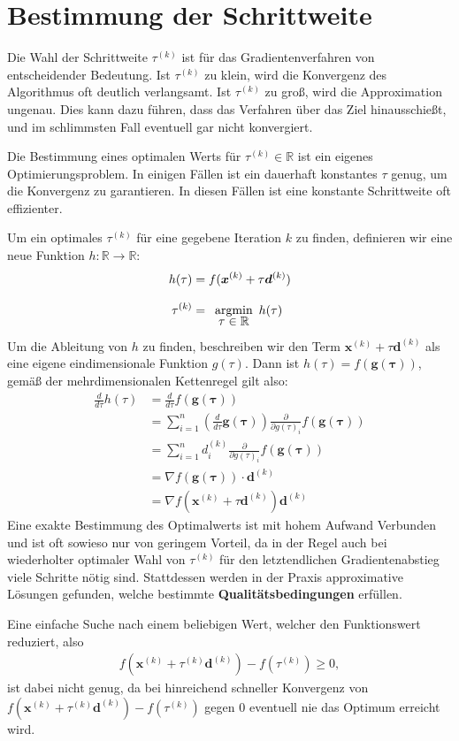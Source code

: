 \documentclass{report}
\newcommand{\tbf}{\textbf}
\newcommand{\argmin}[1] {
    \begin{array}{c}
        \vphantom{#1}\\[-3pt] %
        \text{argmin}\\[-3pt]
        #1\\
        \end{array}
    }
\newcommand{\pd}[2]{\frac{\partial #1}{\partial #2}}
\newcommand{\xk}{\bm{x}^{(k)}}
\newcommand{\dk}{\bm{d}^{(k)}}
\newcommand{\tauk}{\tau^{(k)}}
\newcommand*{\newpar}{\par\vspace{\baselineskip}\noindent}
\begin{document}
\section{Bestimmung der Schrittweite}
Die Wahl der Schrittweite $\tau^{(k)}$ ist für das Gradientenverfahren von entscheidender Bedeutung. Ist $\tau^{(k)}$ zu klein, wird die Konvergenz des Algorithmus oft deutlich verlangsamt. Ist $\tau^{(k)}$ zu groß, wird die Approximation ungenau. Dies kann dazu führen, dass das Verfahren über das Ziel hinausschießt, und im schlimmsten Fall eventuell gar nicht konvergiert.
\newpar
Die Bestimmung eines optimalen Werts für $\tau^{(k)} \in \mathbb{R}$ ist ein eigenes Optimierungsproblem.  In einigen Fällen ist ein dauerhaft konstantes $\tau$ genug, um die Konvergenz zu garantieren. In diesen Fällen ist eine konstante Schrittweite oft effizienter.
\newpar
Um ein optimales $\tau^{(k)}$ für eine gegebene Iteration $k$ zu finden, definieren wir eine neue Funktion $h: \mathbb{R} \to \mathbb{R}$:
\begin{align*}
h(\tau) &= f(\bm{x}^{(k)} + \tau \bm{d}^{(k)})\\
 \tau^{(k)} &= \argmin{\tau \in \mathbb{R}} h(\tau)
\end{align*}
Um die Ableitung von $h$ zu finden, beschreiben wir den Term $\bm{x}^{(k)} + \tau \bm{d}^{(k)}$ als eine eigene eindimensionale Funktion $g(\tau)$. Dann ist $h(\tau) = f(\bm{g(\tau)})$, gemäß der mehrdimensionalen Kettenregel gilt also:
\begin{align*}
 \frac{d}{d\tau}h(\tau) &= \frac{d}{d\tau} f(\bm{g(\tau)})\\
 &= \sum_{i=1}^n \left(\frac{d}{d \tau} \bm{g(\tau)}\right) \pd{}{g(\tau)_i}f(\bm{g(\tau)})\\
 &= \sum_{i=1}^n d^{(k)}_i \pd{}{g(\tau)_i}f(\bm{g(\tau)})\\
 &= \nabla f(\bm{g(\tau)}) \cdot \bm{d}^{(k)}\\
 &= \nabla f(\bm{x}^{(k)} + \tau \bm{d}^{(k)}) \dk
\end{align*}
Eine exakte Bestimmung des Optimalwerts ist mit hohem Aufwand Verbunden und ist oft sowieso nur von geringem Vorteil, da in der Regel auch bei wiederholter optimaler Wahl von $\tauk$ für den letztendlichen Gradientenabstieg viele Schritte nötig sind. Stattdessen werden in der Praxis approximative Lösungen gefunden, welche bestimmte \tbf{Qualitätsbedingungen} erfüllen.
\newpar
Eine einfache Suche nach einem beliebigen Wert, welcher den Funktionswert reduziert, also
\begin{align*}
f(\xk + \tauk \dk) - f(\tauk) \geq 0,
\end{align*}
ist dabei nicht genug, da bei hinreichend schneller Konvergenz von $f(\xk + \tauk \dk) - f(\tauk)$ gegen $0$ eventuell nie das Optimum erreicht wird.
%
\end{document}
